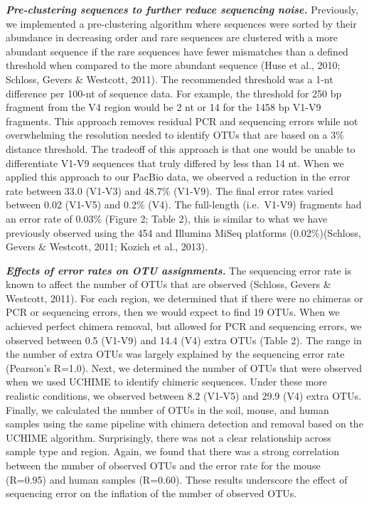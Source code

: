 \documentclass[11pt,]{article}
\begin{document}
\textbf{\emph{Pre-clustering sequences to further reduce sequencing
noise.}} Previously, we implemented a pre-clustering algorithm where
sequences were sorted by their abundance in decreasing order and rare
sequences are clustered with a more abundant sequence if the rare
sequences have fewer mismatches than a defined threshold when compared
to the more abundant sequence (Huse et al., 2010; Schloss, Gevers \&
Westcott, 2011). The recommended threshold was a 1-nt difference per
100-nt of sequence data. For example, the threshold for 250 bp fragment
from the V4 region would be 2 nt or 14 for the 1458 bp V1-V9 fragments.
This approach removes residual PCR and sequencing errors while not
overwhelming the resolution needed to identify OTUs that are based on a
3\% distance threshold. The tradeoff of this approach is that one would
be unable to differentiate V1-V9 sequences that truly differed by less
than 14 nt. When we applied this approach to our PacBio data, we
observed a reduction in the error rate between 33.0 (V1-V3) and 48.7\%
(V1-V9). The final error rates varied between 0.02 (V1-V5) and 0.2\%
(V4). The full-length (i.e.~V1-V9) fragments had an error rate of 0.03\%
(Figure 2; Table 2), this is similar to what we have previously observed
using the 454 and Illumina MiSeq platforms (0.02\%)(Schloss, Gevers \&
Westcott, 2011; Kozich et al., 2013).

\textbf{\emph{Effects of error rates on OTU assignments.}} The
sequencing error rate is known to affect the number of OTUs that are
observed (Schloss, Gevers \& Westcott, 2011). For each region, we
determined that if there were no chimeras or PCR or sequencing errors,
then we would expect to find 19 OTUs. When we achieved perfect chimera
removal, but allowed for PCR and sequencing errors, we observed between
0.5 (V1-V9) and 14.4 (V4) extra OTUs (Table 2). The range in the number
of extra OTUs was largely explained by the sequencing error rate
(Pearson's R=1.0). Next, we determined the number of OTUs that were
observed when we used UCHIME to identify chimeric sequences. Under these
more realistic conditions, we observed between 8.2 (V1-V5) and 29.9 (V4)
extra OTUs. Finally, we calculated the number of OTUs in the soil,
mouse, and human samples using the same pipeline with chimera detection
and removal based on the UCHIME algorithm. Surprisingly, there was not a
clear relationship across sample type and region. Again, we found that
there was a strong correlation between the number of observed OTUs and
the error rate for the mouse (R=0.95) and human samples (R=0.60). These
results underscore the effect of sequencing error on the inflation of
the number of observed OTUs.
\end{document}
